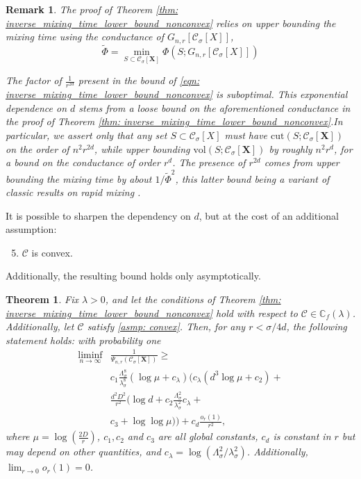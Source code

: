 \documentclass{article}
\newcommand{\vol}{\mathrm{vol}}
\newcommand{\cut}{\mathrm{cut}}
\newcommand{\1}{\mathbf{1}}
\newcommand{\Xbf}{\mathbf{X}}
\newcommand{\Cbb}{\mathbb{C}}
\newcommand{\Cset}{\mathcal{C}}
\newcommand{\Csig}{\Cset_{\sigma}}
\theoremstyle{aldenthm}
\newtheorem{theorem}{Theorem}
\theoremstyle{aldenrmrk}
\newtheorem{remark}{Remark}
\begin{document}
\begin{remark}
	The proof of Theorem \ref{thm: inverse_mixing_time_lower_bound_nonconvex} relies on upper bounding the mixing time using the \emph{conductance} of $G_{n,r}[\Csig[X]]$,
	\begin{equation*}
	\widetilde{\Phi} = \min_{S \subset \Csig[\Xbf]} \Phi(S; G_{n,r}[\Csig[X]])
	\end{equation*}
	
	The factor of $\frac{1}{r^{2d}}$ present in the bound of \eqref{eqn: inverse_mixing_time_lower_bound_nonconvex} is suboptimal. This exponential dependence on $d$ stems from a loose bound on the aforementioned conductance in the proof of Theorem \ref{thm: inverse_mixing_time_lower_bound_nonconvex}.In particular, we assert only that any set $S \subset \Csig[X]$ must have $\cut(S; \Csig[\Xbf])$ on the order of $n^2 r^{2d}$, while upper bounding $\vol(S; \Csig[\Xbf])$ by roughly $n^2 r^d$, for a bound on the conductance of order $r^d$. The presence of $r^{2d}$ comes from upper bounding the mixing time by about $1/\widetilde{\Phi}^2$, this latter bound being a variant of classic results on rapid mixing \cite{jerrum89}.
\end{remark}

It is possible to sharpen the dependency on $d$, but at the cost of an additional assumption:
\begin{enumerate}[label=(A\arabic*)]
	\setcounter{enumi}{4}
	\item 
	\label{asmp: convex}
	$\Cset$ is convex.
\end{enumerate}
Additionally, the resulting bound holds only asymptotically. 

\begin{theorem}
	\label{thm: inverse_mixing_time_lower_bound}
	Fix $\lambda > 0$, and let the conditions of Theorem \ref{thm: inverse_mixing_time_lower_bound_nonconvex} hold with respect to $\Cset \in \Cbb_f(\lambda)$. Additionally, let $\Cset$ satisfy \ref{asmp: convex}. Then, for any $r < \sigma/4d$, the following statement holds: with probability one
	\begin{align}
	\label{eqn: inverse_mixing_time_lower_bound}
	\liminf_{n \to \infty} & \frac{1}{\Psi_{n,r}(\Csig[\Xbf])} \geq \nonumber \\ & c_1 \frac{\Lambda_{\sigma}^8}{\lambda_{\sigma}^8} (\log \mu + c_{\lambda}) \biggl( c_{\lambda}(d^3 \log\mu + c_2) + \nonumber \\
	& \frac{d^2D^2}{r^2} \bigl( \log d + c_2 \frac{\Lambda_{\sigma}^{2}}{\lambda_{\sigma}^{2}}c_{\lambda} + \nonumber \\
	& c_3  + \log \log \mu \bigr) \biggr) + c_d \frac{o_r(1)}{r^2},
	\end{align}
	where $\mu = \log(\frac{2D}{r})$, $c_1,c_2$ and $c_3$ are all global constants, $c_d$ is constant in $r$ but may depend on other quantities,  and $c_{\lambda} = \log(\Lambda_{\sigma}^2/ \lambda_{\sigma}^2)$.  Additionally, $\lim_{r \to 0} o_r(1) = 0$. 
\end{theorem}
\end{document}
